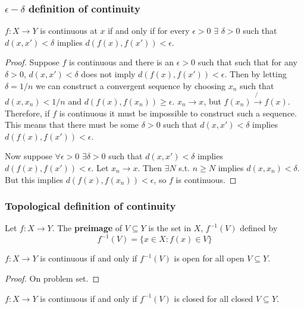 \documentclass[compress]{beamer}
\renewcommand{\to}{{\rightarrow}}
\begin{document}
\begin{frame}
  \frametitle{$\epsilon-\delta$ definition of continuity}
  \begin{lemma}\label{lem:ced}
    $f: X \to Y$ is continuous at $x$ if and only if for every
    $\epsilon>0$ $\exists$ $\delta >0$ such that $d(x,x') < \delta $
    implies $d(f(x),f(x')) < \epsilon$.
  \end{lemma}
  \begin{proof}
    Suppose $f$ is continuous and there is an $\epsilon>0$ such that
    such that for any $\delta>0$, $d(x,x') < \delta$ does not imply
    $d(f(x),f(x'))< \epsilon$. Then by letting $\delta = 1/n$ we can
    construct a convergent sequence by choosing $x_n$ such that
    $d(x,x_n) < 1/n$ and $d(f(x),f(x_n)) \geq \epsilon$. $x_n \to x$,
    but $f(x_n) \not\to f(x)$. Therefore, if $f$ is continuous it must
    be impossible to construct such a sequence. This means that there
    must be some $\delta>0$ such that $d(x,x') < \delta$ implies
    $d(f(x),f(x')) < \epsilon$.
    
    Now suppose $\forall \epsilon>0$ $\exists \delta>0$ such that
    $d(x,x')<\delta$ implies $d(f(x),f(x')) <\epsilon$. Let $x_n \to
    x$. Then $\exists N$ s.t. $n\geq N$ implies $d(x,x_n) < \delta$. But
    this implies $d(f(x),f(x_n)) < \epsilon$, so $f$ is continuous.
  \end{proof}
\end{frame}

\begin{frame}
  \frametitle{Topological definition of continuity}
  \begin{definition}
    Let $f: X \to Y$. The \textbf{preimage} of $V \subseteq Y$ is the
    set in $X$, $f^{-1}(V)$ defined by
    \[ f^{-1} (V) = \{ x \in X: f(x) \in V \} \]
  \end{definition}
  
  \begin{lemma}\label{lem:copen}
    $f:X \to Y$ is continuous if and only if $f^{-1}(V)$ is open for all
    open $V \subseteq Y$. 
  \end{lemma}
  \begin{proof}
    On problem set.
  \end{proof}
  \begin{corollary}
    $f:X \to Y$ is continuous if and only if $f^{-1}(V)$ is closed for all
    closed $V \subseteq Y$. 
  \end{corollary}
\end{frame}
\end{document}
